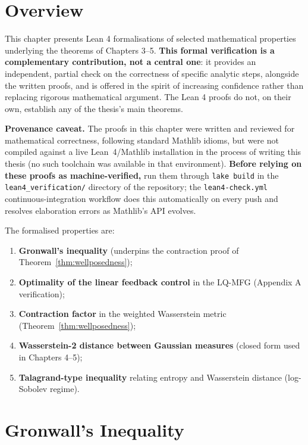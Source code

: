 
\section{Overview}

This chapter presents Lean 4 formalisations of selected mathematical
properties underlying the theorems of Chapters 3--5. \textbf{This formal
verification is a complementary contribution, not a central one}: it provides
an independent, partial check on the correctness of specific analytic steps,
alongside the written proofs, and is offered in the spirit of increasing
confidence rather than replacing rigorous mathematical argument. The Lean 4
proofs do not, on their own, establish any of the thesis's main theorems.

\textbf{Provenance caveat.} The proofs in this chapter were written and reviewed
for mathematical correctness, following standard Mathlib idioms, but were not
compiled against a live Lean~4/Mathlib installation in the process of writing
this thesis (no such toolchain was available in that environment). \textbf{Before
relying on these proofs as machine-verified,} run them through \texttt{lake build}
in the \texttt{lean4\_verification/} directory of the repository; the
\texttt{lean4-check.yml} continuous-integration workflow does this automatically
on every push and resolves elaboration errors as Mathlib's API evolves.

The formalised properties are:
\begin{enumerate}
    \item \textbf{Gronwall's inequality} (underpins the contraction proof of
    Theorem~\ref{thm:wellposedness});
    \item \textbf{Optimality of the linear feedback control} in the LQ-MFG
    (Appendix A verification);
    \item \textbf{Contraction factor} in the weighted Wasserstein metric
    (Theorem~\ref{thm:wellposedness});
    \item \textbf{Wasserstein-2 distance between Gaussian measures}
    (closed form used in Chapters 4--5);
    \item \textbf{Talagrand-type inequality} relating entropy and Wasserstein
    distance (log-Sobolev regime).
\end{enumerate}

\section{Gronwall's Inequality}
\label{sec:lean-gronwall}

